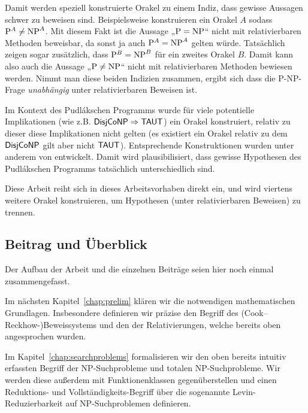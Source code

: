 Damit werden speziell konstruierte Orakel zu einem Indiz, dass gewisse Aussagen schwer zu beweisen sind.
Beispielsweise konstruieren \textcite{baker_relativizations_1975} ein Orakel $A$ sodass $\mathrm{P}^A\neq \mathrm{NP}^A$. Mit diesem Fakt ist die Aussage „$\mathrm{P}=\mathrm{NP}$“ nicht mit relativierbaren Methoden beweisbar, da sonst ja auch $\mathrm{P}^A=\mathrm{NP}^A$ gelten würde. Tatsächlich zeigen \citeauthor{baker_relativizations_1975} sogar zusätzlich, dass $\mathrm{P}^B= \mathrm{NP}^B$ für ein zweites Orakel $B$. Damit kann also auch die Aussage „$\mathrm{P}\neq\mathrm{NP}$“ nicht mit relativierbaren Methoden bewiesen werden. Nimmt man diese beiden Indizien zusammen, ergibt sich dass die P-NP-Frage \emph{unabhängig} unter relativierbaren Beweisen ist.

Im Kontext des Pudlákschen Programms wurde für viele potentielle Implikationen (wie z.B. $\mathsf{DisjCoNP}\Rightarrow\mathsf{TAUT}$) ein Orakel konstruiert, relativ zu dieser diese Implikationen nicht gelten (es existiert ein Orakel relativ zu dem $\mathsf{DisjCoNP}$ gilt aber nicht $\mathsf{TAUT}$). Entsprechende Konstruktionen wurden unter anderem von \textcites{glaser_disjoint_2004}{dose_np-completeness_2019}{dose_balance_2020}{dose_further_2020}{dingel_separation_2022}{ehrmanntraut_oracle_2022}{khaniki_new_2022} entwickelt. Damit wird plausibilisiert, dass gewisse Hypothesen des Pudlákschen Programms tatsächlich unterschiedlich sind.

Diese Arbeit reiht sich in dieses Arbeitsvorhaben direkt ein, und wird viertens weitere Orakel konstruieren, um Hypothesen (unter relativierbaren Beweisen) zu trennen.

\subsection*{Beitrag und Überblick}

Der Aufbau der Arbeit und die einzelnen Beiträge seien hier noch einmal zusammengefasst.

Im nächsten Kapitel~\ref{chap:prelim} klären wir die notwendigen mathematischen Grundlagen. Insbesondere definieren wir präzise den Begriff des (Cook--Reckhow-)Beweissystems und den der Relativierungen, welche bereits oben angesprochen wurden.

Im Kapitel~\ref{chap:searchproblems} formalisieren wir den oben bereits intuitiv erfassten Begriff der NP-Suchprobleme und totalen NP-Suchprobleme. 
Wir werden diese außerdem mit Funktionenklassen gegenüberstellen und einen Reduktions- und Vollständigkeits-Begriff über die sogenannte Levin-Reduzierbarkeit auf NP-Suchproblemen definieren.

